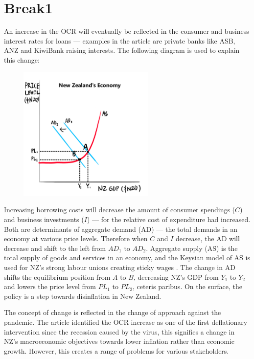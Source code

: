 \documentclass[a4paper,12pt]{article}
\begin{document}
\section{Break1}

An increase in the OCR will eventually be reflected in the consumer and business interest rates for loans --- examples in the article are private banks like ASB, ANZ and KiwiBank raising interests. The following diagram is used to explain this change:

\begin{figure}[H]
    \centering
    \includegraphics[width=0.6\textwidth]{assets/macro.png}
\end{figure}

Increasing borrowing costs will decrease the amount of consumer spendings ($C$) and business investments ($I$) --- for the relative cost of expenditure had increased. Both are determinants of aggregate demand (AD) --- the total demands in an economy at various price levels. Therefore when $C$ and $I$ decrease, the AD will decrease and shift to the left from $AD_1$ to $AD_2$. Aggregate supply (AS) is the total supply of goods and services in an economy, and the Keysian model of AS is used for NZ's strong labour unions creating sticky wages \parencite{labor}. The change in AD shifts the equilibrium position from $A$ to $B$, decreasing NZ's GDP from $Y_1$ to $Y_2$ and lowers the price level from $PL_1$ to $PL_2$, ceteris paribus. On the surface, the policy is a step towards disinflation in New Zealand.

The concept of change is reflected in the change of approach against the pandemic. The article identified the OCR increase as one of the first deflationary intervention since the recession caused by the virus, this signifies a change in NZ's macroeconomic objectives towards lower inflation rather than economic growth. However, this creates a range of problems for various stakeholders.
\end{document}
